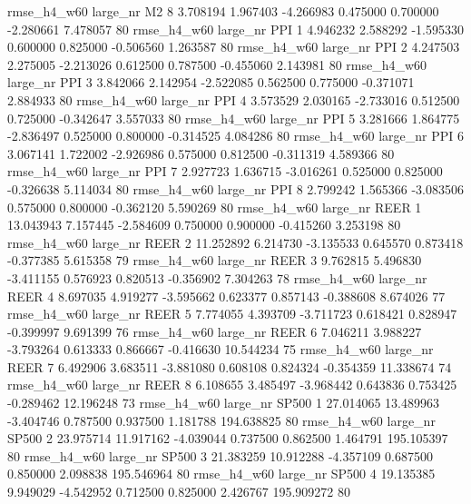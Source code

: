  rmse_h4_w60   large_nr       M2                 8  3.708194  1.967403  -4.266983 0.475000 0.700000 -2.280661    7.478057 80
 rmse_h4_w60   large_nr      PPI                 1  4.946232  2.588292  -1.595330 0.600000 0.825000 -0.506560    1.263587 80
 rmse_h4_w60   large_nr      PPI                 2  4.247503  2.275005  -2.213026 0.612500 0.787500 -0.455060    2.143981 80
 rmse_h4_w60   large_nr      PPI                 3  3.842066  2.142954  -2.522085 0.562500 0.775000 -0.371071    2.884933 80
 rmse_h4_w60   large_nr      PPI                 4  3.573529  2.030165  -2.733016 0.512500 0.725000 -0.342647    3.557033 80
 rmse_h4_w60   large_nr      PPI                 5  3.281666  1.864775  -2.836497 0.525000 0.800000 -0.314525    4.084286 80
 rmse_h4_w60   large_nr      PPI                 6  3.067141  1.722002  -2.926986 0.575000 0.812500 -0.311319    4.589366 80
 rmse_h4_w60   large_nr      PPI                 7  2.927723  1.636715  -3.016261 0.525000 0.825000 -0.326638    5.114034 80
 rmse_h4_w60   large_nr      PPI                 8  2.799242  1.565366  -3.083506 0.575000 0.800000 -0.362120    5.590269 80
 rmse_h4_w60   large_nr     REER                 1 13.043943  7.157445  -2.584609 0.750000 0.900000 -0.415260    3.253198 80
 rmse_h4_w60   large_nr     REER                 2 11.252892  6.214730  -3.135533 0.645570 0.873418 -0.377385    5.615358 79
 rmse_h4_w60   large_nr     REER                 3  9.762815  5.496830  -3.411155 0.576923 0.820513 -0.356902    7.304263 78
 rmse_h4_w60   large_nr     REER                 4  8.697035  4.919277  -3.595662 0.623377 0.857143 -0.388608    8.674026 77
 rmse_h4_w60   large_nr     REER                 5  7.774055  4.393709  -3.711723 0.618421 0.828947 -0.399997    9.691399 76
 rmse_h4_w60   large_nr     REER                 6  7.046211  3.988227  -3.793264 0.613333 0.866667 -0.416630   10.544234 75
 rmse_h4_w60   large_nr     REER                 7  6.492906  3.683511  -3.881080 0.608108 0.824324 -0.354359   11.338674 74
 rmse_h4_w60   large_nr     REER                 8  6.108655  3.485497  -3.968442 0.643836 0.753425 -0.289462   12.196248 73
 rmse_h4_w60   large_nr    SP500                 1 27.014065 13.489963  -3.404746 0.787500 0.937500  1.181788  194.638825 80
 rmse_h4_w60   large_nr    SP500                 2 23.975714 11.917162  -4.039044 0.737500 0.862500  1.464791  195.105397 80
 rmse_h4_w60   large_nr    SP500                 3 21.383259 10.912288  -4.357109 0.687500 0.850000  2.098838  195.546964 80
 rmse_h4_w60   large_nr    SP500                 4 19.135385  9.949029  -4.542952 0.712500 0.825000  2.426767  195.909272 80
